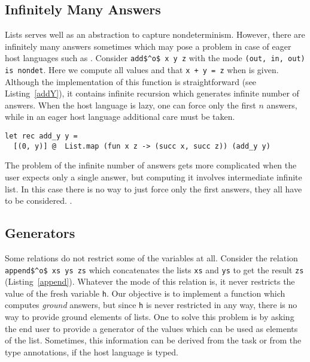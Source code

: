 \subsection{Infinitely Many Answers}

Lists serves well as an abstraction to capture nondeterminism.
However, there are infinitely many answers sometimes which may pose a problem in case of eager host languages such as \ocaml.
Consider \lstinline{add$^o$ x y z} with the mode \lstinline{(out, in, out) is nondet}.
Here we compute all values \x and \z that \lstinline{x + y = z} when \y is given.
Although the implementation of this function is straightforward (see Listing~\ref{addY}), it contains infinite recursion which generates infinite number of answers.
When the host language is lazy, one can force only the first $n$ answers, while in an eager host language additional care must be taken.

\begin{figure*}[!t]
  \centering
  \begin{minipage}{0.68\textwidth}
    \begin{lstlisting}[label={addY}, caption={Functional representation of \lstinline{addo x y z} with the mode \lstinline{(out, in, out) is nondet}}, captionpos=b, frame=tb]
let rec add_y y =
  [(0, y)] @  List.map (fun x z -> (succ x, succ z)) (add_y y)
    \end{lstlisting}
  \end{minipage}
\end{figure*}

The problem of the infinite number of answers gets more complicated when the user expects only a single answer, but computing it involves intermediate infinite list.
In this case there is no way to just force only the first answers, they all have to be considered. .

\subsection{Generators}

Some relations do not restrict some of the variables at all.
Consider the relation \lstinline{append$^o$ xs ys zs} which concatenates the lists \lstinline{xs} and \lstinline{ys} to get the result \lstinline{zs} (Listing~\ref{append}).
Whatever the mode of this relation is, it never restricts the value of the fresh variable \lstinline{h}.
Our objective is to implement a function which computes \emph{ground} answers, but since \lstinline{h} is never restricted in any way, there is no way to provide ground elements of lists.
One to solve this problem is by asking the end user to provide a generator of the values which can be used as elements of the list.
Sometimes, this information can be derived from the task or from the type annotations, if the host language is typed.

